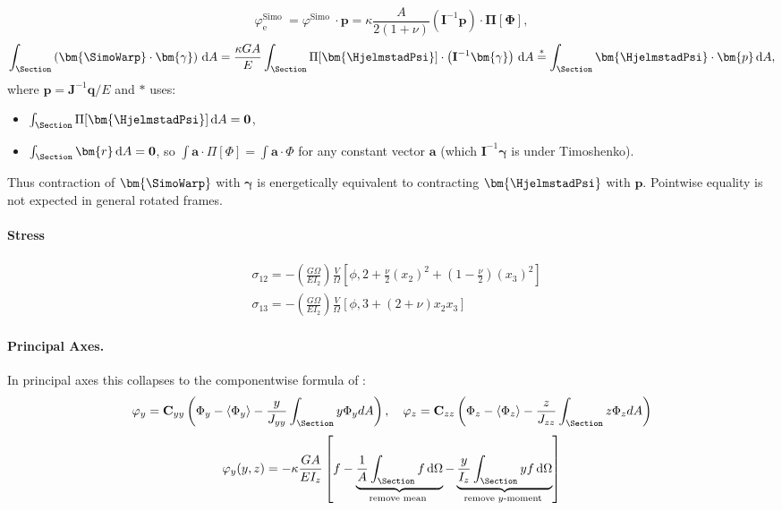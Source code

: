 \begin{equation}
\varphi_{\mathrm{e}}^{\text {Simo }}=\varphi^{\text {Simo }} \cdot \bm{p}= \kappa \frac{A}{2(1+\nu)} \left(\mathbf{I}^{-1} \bm{p}\right) \cdot \mathbf{\Pi}[\mathbf{\Phi}],
\end{equation}
$$
\int_{\Section}\left(\bm{\SimoWarp} \cdot \bm{\gamma}\right) \,\mathrm{d} A
=\frac{\kappa G A}{E} \int_{\Section} \Pi[\bm{\HjelmstadPsi}] \cdot\left(\mathbf{I}^{-1} \bm{\gamma}\right) \,\mathrm{d} A 
\stackrel{*}{=} \int_{\Section} \bm{\HjelmstadPsi} \cdot \bm{p} \,\mathrm{d} A,
$$
where $\bm{p}=\mathbf{J}^{-1} \bm{q}/E$ and $*$ uses:
\begin{itemize}
\item $\int_{\Section} \Pi[\bm{\HjelmstadPsi}]\, \mathrm{d} A=\mathbf{0}$,
\item $\int_{\Section} \bm{r} \,\mathrm{d} A=\mathbf{0}$, so $\int \bm{a} \cdot \Pi[\Phi]=\int \bm{a} \cdot \Phi$ for any constant vector $\bm{a}$ (which $\mathbf{I}^{-1} \bm{\gamma}$ is under Timoshenko).
\end{itemize}
Thus contraction of \(\bm{\SimoWarp}\) with $\bm{\gamma}$ is energetically equivalent to contracting $\bm{\HjelmstadPsi}$ with $\bm{p}$. 
Pointwise equality is not expected in general rotated frames.

\paragraph{Stress}
$$
\begin{aligned}
& \sigma_{12}=-\left(\frac{G \Omega}{E I_2}\right) \frac{V}{\Omega}\left[\phi, 2+\frac{\nu}{2}\left(x_2\right)^2+\left(1-\frac{\nu}{2}\right)\left(x_3\right)^2\right] \\
& \sigma_{13}=-\left(\frac{G \Omega}{E I_2}\right) \frac{V}{\Omega}\left[\phi, 3+(2+\nu) x_2 x_3\right]
\end{aligned}
$$
\paragraph{Principal Axes.}
In principal axes this collapses to the componentwise formula of \cite{simo1982consistent}:
$$
\varphi_y=\mathbf{C}_{y y}\left(\Phi_y-\left\langle\Phi_y\right\rangle-\frac{y}{J_{y y}} \int_{\Section} y \Phi_y d A\right), \quad \varphi_z=\mathbf{C}_{z z}\left(\Phi_z-\left\langle\Phi_z\right\rangle-\frac{z}{J_{z z}} \int_{\Section} z \Phi_z d A\right)
$$
\begin{equation*}
\varphi_y(y, z)=-\kappa \frac{G A}{E I_z}\left[f-\underbrace{\frac{1}{A} \int_{\Section} f \,\mathrm{d} \Omega}_{\text {remove mean }}-\underbrace{\frac{y}{I_z} \int_{\Section} y f \,\mathrm{d} \Omega}_{\text {remove } y \text {-moment }}\right]
\end{equation*}

